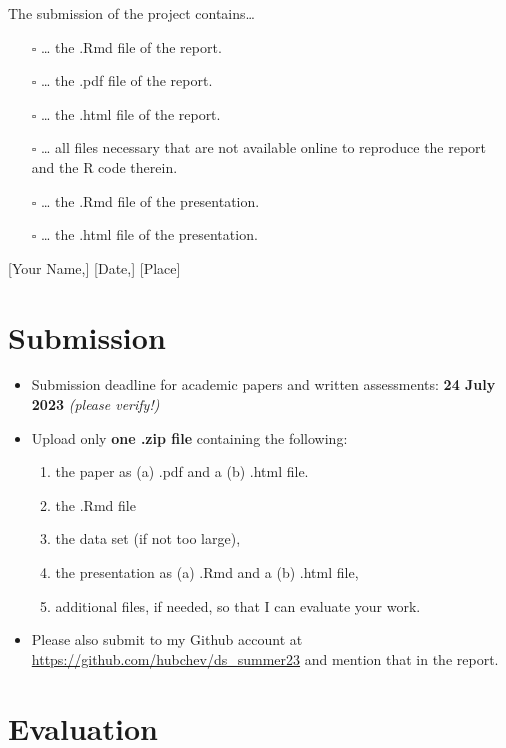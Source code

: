 \documentclass[
  12pt,
]{article}
\providecommand{\tightlist}{%
  \setlength{\itemsep}{0pt}\setlength{\parskip}{0pt}}
\begin{document}
The submission of the project contains\ldots{}

\begin{itemize}
\tightlist
\item[$\square$]
  \ldots{} the .Rmd file of the
  report.
\item[$\square$]
  \ldots{} the .pdf file of the report.
\item[$\square$]
  \ldots{} the .html file of the report.
\item[$\square$]
  \ldots{} all files necessary that are not available online to reproduce the report and the R code therein.
\item[$\square$]
  \ldots{} the .Rmd file of the presentation.
\item[$\square$]
  \ldots{} the .html file of the presentation.
\end{itemize}

{[}Your Name,{]} {[}Date,{]} {[}Place{]}

\hypertarget{submission}{%
\section{Submission}\label{submission}}

\begin{itemize}
\tightlist
\item
  Submission deadline for academic papers and written assessments: \textbf{24 July 2023} \emph{(please verify!)}
\item
  Upload only \textbf{one .zip file} containing the following:

  \begin{enumerate}
  \def\labelenumi{\arabic{enumi}.}
  \tightlist
  \item
    the paper as (a) .pdf and a (b) .html file.
  \item
    the .Rmd file
  \item
    the data set (if not too large),
  \item
    the presentation as (a) .Rmd and a (b) .html file,
  \item
    additional files, if needed, so that I can evaluate your work.
  \end{enumerate}
\item
  Please also submit to my Github account at \url{https://github.com/hubchev/ds_summer23} and mention that in the report.
\end{itemize}

\hypertarget{evaluation}{%
\section{Evaluation}\label{evaluation}}
\end{document}
